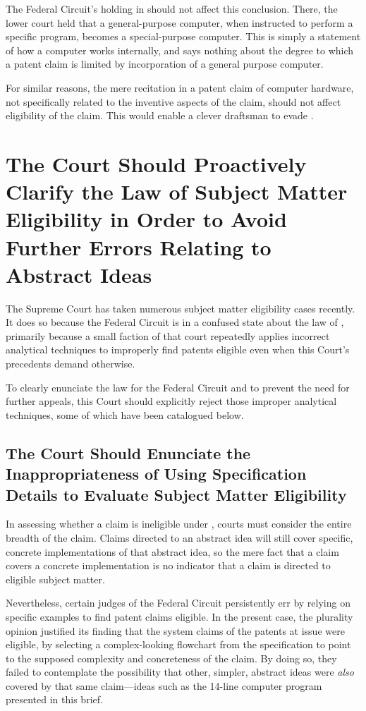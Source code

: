 \documentclass{scotus}
\begin{document}
%
%
The Federal Circuit's holding in  should not affect this
conclusion. There, the lower court held that a general-purpose computer, when
instructed to perform a specific program, becomes a special-purpose computer.
This is simply a statement of how a computer works internally, and says nothing
about the degree to which a patent claim is limited by incorporation of a
general purpose computer.

%
%
For similar reasons, the mere recitation in a patent claim of computer hardware,
not specifically related to the inventive aspects of the claim, should not
affect eligibility of the claim. This would enable a clever draftsman to evade
.

\section{The Court Should Proactively Clarify the Law of Subject Matter
Eligibility in Order to Avoid Further Errors Relating to Abstract Ideas}

The Supreme Court has taken numerous subject matter eligibility cases recently.
It does so because the Federal Circuit is in a confused state about the law of
, primarily because a small faction of that court repeatedly applies
incorrect analytical techniques to improperly find patents eligible even when
this Court's precedents demand otherwise.

To clearly enunciate the law for the Federal Circuit and to prevent the need for
further appeals, this Court should explicitly reject those improper analytical
techniques, some of which have been catalogued below.

\subsection{The Court Should Enunciate the Inappropriateness of Using
Specification Details to Evaluate Subject Matter Eligibility}

In assessing whether a claim is ineligible under , courts must
consider the entire breadth of the claim. Claims directed to an abstract idea
will still cover specific, concrete implementations of that abstract idea, so
the mere fact that a claim covers a concrete implementation is no indicator that
a claim is directed to eligible subject matter.

Nevertheless, certain judges of the Federal Circuit persistently err by relying
on specific examples to find patent claims eligible. In the present case, the
plurality opinion justified its finding that the system claims of the patents at
issue were eligible, by selecting a complex-looking flowchart from the
specification to point to the supposed complexity and concreteness of the claim.
By doing so, they failed to contemplate the possibility that other, simpler,
abstract ideas were \emph{also} covered by that same claim---ideas such as the
14-line computer program presented in this brief.
\end{document}
